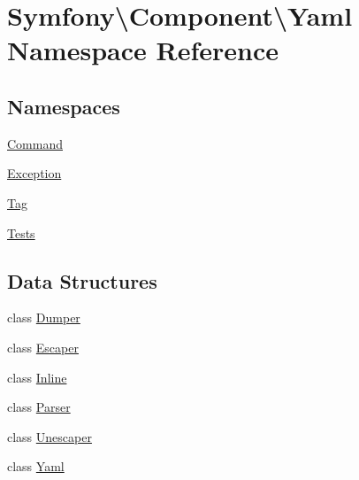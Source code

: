 \hypertarget{namespace_symfony_1_1_component_1_1_yaml}{}\section{Symfony\textbackslash{}Component\textbackslash{}Yaml Namespace Reference}
\label{namespace_symfony_1_1_component_1_1_yaml}
\subsection*{Namespaces}
\begin{DoxyCompactItemize}
\item 
 \mbox{\hyperlink{namespace_symfony_1_1_component_1_1_yaml_1_1_command}{Command}}
\item 
 \mbox{\hyperlink{namespace_symfony_1_1_component_1_1_yaml_1_1_exception}{Exception}}
\item 
 \mbox{\hyperlink{namespace_symfony_1_1_component_1_1_yaml_1_1_tag}{Tag}}
\item 
 \mbox{\hyperlink{namespace_symfony_1_1_component_1_1_yaml_1_1_tests}{Tests}}
\end{DoxyCompactItemize}
\subsection*{Data Structures}
\begin{DoxyCompactItemize}
\item 
class \mbox{\hyperlink{class_symfony_1_1_component_1_1_yaml_1_1_dumper}{Dumper}}
\item 
class \mbox{\hyperlink{class_symfony_1_1_component_1_1_yaml_1_1_escaper}{Escaper}}
\item 
class \mbox{\hyperlink{class_symfony_1_1_component_1_1_yaml_1_1_inline}{Inline}}
\item 
class \mbox{\hyperlink{class_symfony_1_1_component_1_1_yaml_1_1_parser}{Parser}}
\item 
class \mbox{\hyperlink{class_symfony_1_1_component_1_1_yaml_1_1_unescaper}{Unescaper}}
\item 
class \mbox{\hyperlink{class_symfony_1_1_component_1_1_yaml_1_1_yaml}{Yaml}}
\end{DoxyCompactItemize}
